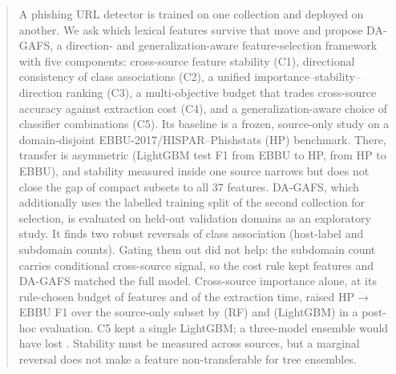 \begin{abstract}
A phishing URL detector is trained on one collection and deployed on another. We ask which lexical features survive that move and propose DA-GAFS, a direction- and generalization-aware feature-selection framework with five components: cross-source feature stability (C1), directional consistency of class associations (C2), a unified importance--stability--direction ranking (C3), a multi-objective budget that trades cross-source accuracy against extraction cost (C4), and a generalization-aware choice of classifier combinations (C5). Its baseline is a frozen, source-only study on a domain-disjoint EBBU-2017/HISPAR--Phishstats (HP) benchmark. There, transfer is asymmetric (LightGBM test F1  from EBBU to HP,  from HP to EBBU), and stability measured inside one source narrows but does not close the gap of compact subsets to all 37 features. DA-GAFS, which additionally uses the labelled training split of the second collection for selection, is evaluated on held-out validation domains as an exploratory study. It finds two robust reversals of class association (host-label and subdomain counts). Gating them out did not help: the subdomain count carries conditional cross-source signal, so the cost rule kept  features and DA-GAFS matched the full model. Cross-source importance alone, at its rule-chosen budget of  features and  of the extraction time, raised HP$\rightarrow$EBBU F1 over the source-only subset by  (RF) and  (LightGBM) in a post-hoc evaluation. C5 kept a single LightGBM; a three-model ensemble would have lost . Stability must be measured across sources, but a marginal reversal does not make a feature non-transferable for tree ensembles.
\end{abstract}

